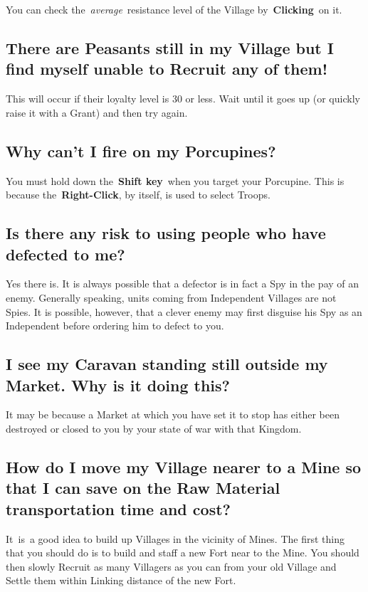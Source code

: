 You can check the \textit{average} resistance level of the Village by \textbf{Clicking} on it.

\subsection{There are Peasants still in my Village but I find myself unable to Recruit any of them!}

This will occur if their loyalty level is 30 or less. Wait until it goes up (or quickly raise it with a Grant) and then try again.

\subsection{Why can’t I fire on my Porcupines?}

You must hold down the \textbf{Shift key} when you target your Porcupine. This is because the \textbf{Right-Click}, by itself, is used to select Troops.

\subsection{Is there any risk to using people who have defected to me?}

Yes there is. It is always possible that a defector is in fact a Spy in the pay of an enemy. Generally speaking, units coming from Independent Villages are not Spies. It is possible, however, that a clever enemy may first disguise his Spy as an Independent before ordering him to defect to you.

\subsection{I see my Caravan standing still outside my Market. Why is it doing this?}

It may be because a Market at which you have set it to stop has either been destroyed or closed to you by your state of war with that Kingdom.

\subsection{How do I move my Village nearer to a Mine so that I can save on the Raw Material transportation time and cost?}

It is a good idea to build up Villages in the vicinity of Mines. The first thing that you should do is to build and staff a new Fort near to the Mine. You should then slowly Recruit as many Villagers as you can from your old Village and Settle them within Linking distance of the new Fort.

